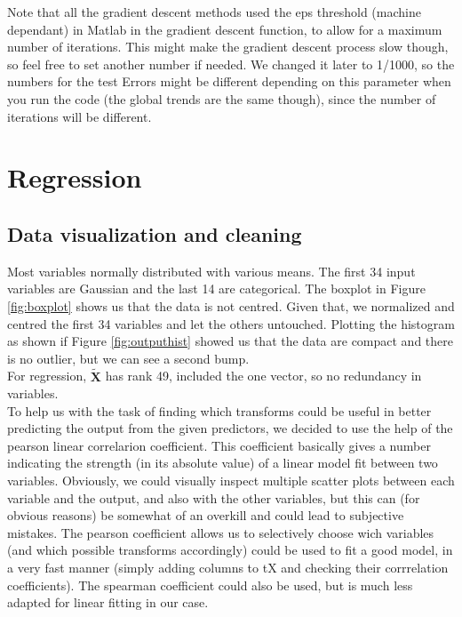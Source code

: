 \documentclass{article} %
\begin{document}
Note that all the gradient descent methods used the eps threshold (machine dependant) in Matlab in the gradient descent function, to allow for a maximum number of iterations. This might make the gradient descent process slow though, so feel free to set another number if needed. We changed it later to 1/1000, so the numbers for the test Errors might be different depending on this parameter when you run the code (the global trends are the same though), since the number of iterations will be different.

\section{Regression}
\subsection{Data visualization and cleaning}
Most variables normally distributed with various means. The first 34 input variables are Gaussian and the last 14 are categorical. The boxplot in Figure \ref{fig:boxplot} shows us that the data is not centred. Given that, we normalized and centred the first 34 variables and let the others untouched. Plotting the histogram as shown if Figure \ref{fig:outputhist} showed us that the data are compact and there is no outlier, but we can see a second bump.\\
For regression, $\mathbf{\tilde{X}}$ has rank 49, included the one vector, so no redundancy in variables.\\

To help us with the task of finding which transforms could be useful in better predicting the output from the given predictors, we decided to use the help of the pearson linear correlarion coefficient. This coefficient basically gives a number indicating the strength (in its absolute value) of a linear model fit between two variables. Obviously, we could visually inspect multiple scatter plots between each variable and the output, and also with the other variables, but this can (for obvious reasons) be somewhat of an overkill and could lead to subjective mistakes. The pearson coefficient allows us to selectively choose wich variables (and which possible transforms accordingly) could be used to fit a good model, in a very fast manner (simply adding columns to tX and checking their corrrelation coefficients). The spearman coefficient could also be used, but is much less adapted for linear fitting in our case.\\
\end{document}
